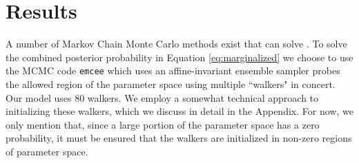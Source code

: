 \documentclass[12pt, preprint]{aastex}
\newcommand{\given}{\,|\,}
\begin{document}

 


\section{Results}

A number of Markov Chain Monte Carlo methods exist that can solve . To solve the combined posterior probability in Equation \ref{eq:marginalized} we choose to use the MCMC code {\tt emcee} \citep{foreman-mackey13} which uses an affine-invariant ensemble sampler probes the allowed region of the parameter space using multiple ``walkers" in concert\citep{goodman10}. Our model uses 80 walkers. We employ a somewhat technical approach to initializing these walkers, which we discuss in detail in the Appendix. For now, we only mention that, since a large portion of the parameter space has a zero probability, it must be ensured that the walkers are initialized in non-zero regions of parameter space.
\end{document}
